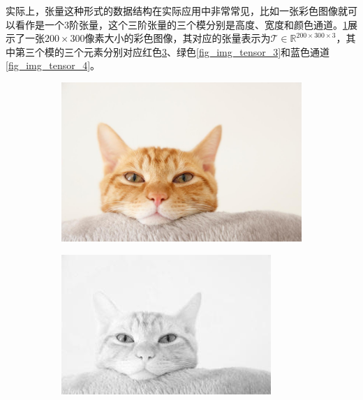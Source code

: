 实际上，张量这种形式的数据结构在实际应用中非常常见，比如一张彩色图像就可以看作是一个3阶张量，这个三阶张量的三个模分别是高度、宽度和颜色通道。\cref{fig_img_tensor_1}展示了一张\( 200 \times 300 \)像素大小的彩色图像，其对应的张量表示为\( \mathcal{T} \in \mathbb{R}^{200 \times 300 \times 3} \)，其中第三个模的三个元素分别对应红色\cref{fig_img_tensor_2}、绿色\cref{fig_img_tensor_3}和蓝色通道\cref{fig_img_tensor_4}。

\begin{figure}[htb!]
    \centering
    \begin{subfigure}{.23\textwidth}
        \centering
        \includegraphics[width=.9\textwidth]{./img/matrix/cat.jpg}
        \caption{}
        \label{fig_img_tensor_1}
    \end{subfigure}
    \begin{subfigure}{.23\textwidth}
        \centering
        \includegraphics[width=.9\textwidth]{./img/matrix/cat_r.jpg}
        \caption{}
        \label{fig_img_tensor_2}
    \end{subfigure}

\end{figure}
